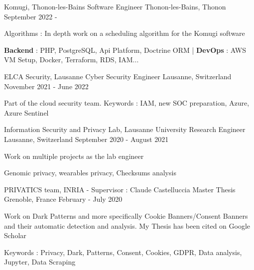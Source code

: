 


\begin{cventries}
	
	\cventry
	{Komugi, Thonon-les-Bains} %
	{Software Engineer} %
	{Thonon-les-Bains, Thonon} %
	{September 2022 - } %
	{ %
		\begin{cvitems}
			\item {Algorithms : In depth work on a scheduling algorithm for the Komugi software}
			\item {\textbf{Backend} : PHP, PostgreSQL, Api Platform, Doctrine ORM | \textbf{DevOps} : AWS VM Setup, Docker, Terraform, RDS, IAM...}
		\end{cvitems}
	}
	
	\cventry
	{ELCA Security, Lausanne} %
	{Cyber Security Engineer} %
	{Lausanne, Switzerland} %
	{November 2021 - June 2022} %
	{ %
		\begin{cvitems}
			\item {Part of the cloud security team. Keywords : IAM, new SOC preparation, Azure, Azure Sentinel}
		\end{cvitems}
	}
	
	\cventry
	{Information Security and Privacy Lab, Lausanne University} %
	{Research Engineer} %
	{Lausanne, Switzerland} %
	{September 2020 - August 2021} %
	{ %
		\begin{cvitems}
			\item {Work on multiple projects as the lab engineer}
			\item {Genomic privacy, wearables privacy, Checksums analysis}
		\end{cvitems}
	}
	
	\cventry
	{PRIVATICS team, INRIA - Supervisor : Claude Castelluccia} %
	{Master Thesis} %
	{Grenoble, France} %
	{February - July 2020} %
	{ %
		\begin{cvitems}
			\item {Work on Dark Patterns and more specifically Cookie Banners/Consent Banners and their automatic detection and analysis. My Thesis has been cited on Google Scholar}
			\item {Keywords : Privacy, Dark, Patterns, Consent, Cookies, GDPR, Data analysis, Jupyter, Data Scraping}
		\end{cvitems}
	}
	

\end{cventries}
